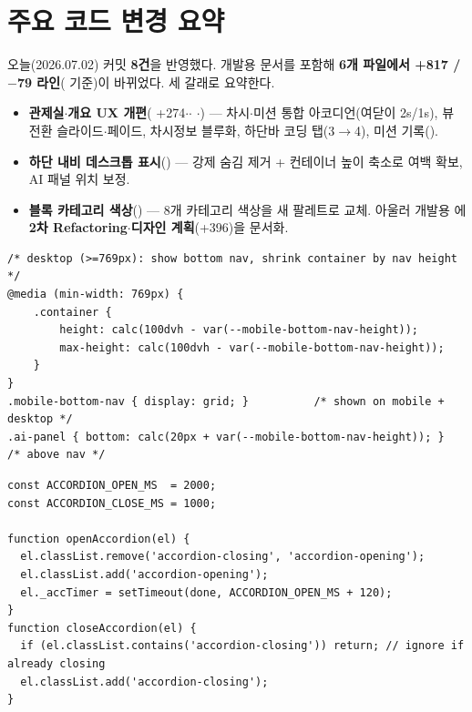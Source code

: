 \section{주요 코드 변경 요약}
오늘(2026.07.02) 커밋 \textbf{8건}을 반영했다. 개발용  문서를 포함해
\textbf{6개 파일에서 +817 / $-$79 라인}( 기준)이 바뀌었다. 세 갈래로 요약한다.

\begin{itemize}
  \item \textbf{관제실$\cdot$개요 UX 개편}( +274$\cdot$$\cdot$%
  $\cdot$) — 차시$\cdot$미션 통합 아코디언(여닫이 2s/1s), 뷰 전환
  슬라이드$\cdot$페이드, 차시정보 블루화, 하단바 코딩 탭(3$\to$4), 미션 기록().
  \item \textbf{하단 내비 데스크톱 표시}() — \code{$\geq$769px} 강제 숨김 제거 +
  컨테이너 높이 축소로 여백 확보, AI 패널 위치 보정.
  \item \textbf{블록 카테고리 색상}() — 8개 카테고리 색상을 새 팔레트로 교체. 아울러
  개발용 에 \textbf{2차 Refactoring$\cdot$디자인 계획}(+396)을 문서화.
\end{itemize}

\begin{verbatim}
/* desktop (>=769px): show bottom nav, shrink container by nav height */
@media (min-width: 769px) {
    .container {
        height: calc(100dvh - var(--mobile-bottom-nav-height));
        max-height: calc(100dvh - var(--mobile-bottom-nav-height));
    }
}
.mobile-bottom-nav { display: grid; }          /* shown on mobile + desktop */
.ai-panel { bottom: calc(20px + var(--mobile-bottom-nav-height)); }  /* above nav */
\end{verbatim}

\begin{verbatim}
const ACCORDION_OPEN_MS  = 2000;
const ACCORDION_CLOSE_MS = 1000;

function openAccordion(el) {
  el.classList.remove('accordion-closing', 'accordion-opening');
  el.classList.add('accordion-opening');
  el._accTimer = setTimeout(done, ACCORDION_OPEN_MS + 120);
}
function closeAccordion(el) {
  if (el.classList.contains('accordion-closing')) return; // ignore if already closing
  el.classList.add('accordion-closing');
}
\end{verbatim}

